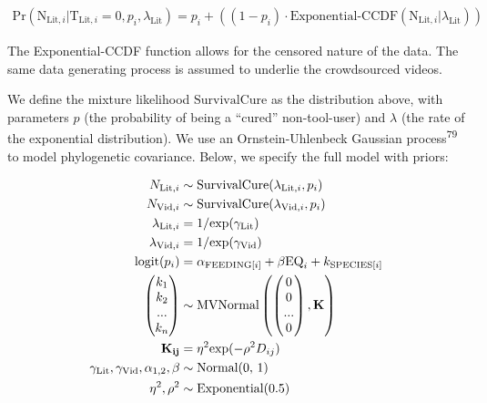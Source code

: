 \documentclass[
  man,floatsintext]{apa6}
\begin{document}
\begin{align}
\text{Pr}(\text{N}_{\text{Lit},i}|\text{T}_{\text{Lit},i} = 0,p_i,\lambda_\text{Lit}) = p_i + ((1-p_i)\cdot\text{Exponential-CCDF}(\text{N}_{\text{Lit},i}|\lambda_\text{Lit}))
\end{align}

The Exponential-CCDF function allows for the censored nature of the data. The same data generating process is assumed to underlie the crowdsourced videos.

We define the mixture likelihood \(\text{SurvivalCure}\) as the distribution above, with parameters \(p\) (the probability of being a ``cured'' non-tool-user) and \(\lambda\) (the rate of the exponential distribution). We use an Ornstein-Uhlenbeck Gaussian process\textsuperscript{79} to model phylogenetic covariance. Below, we specify the full model with priors:

\begin{align}
N_{\text{Lit},i} &\sim \text{SurvivalCure}(\lambda_{\text{Lit},i}, p_{i}) \\
N_{\text{Vid},i} &\sim \text{SurvivalCure}(\lambda_{\text{Vid},i}, p_{i}) \nonumber \\
\lambda_{\text{Lit},i} &= 1 / \text{exp}(\gamma_\text{Lit}) \nonumber \\
\lambda_{\text{Vid},i} &= 1 / \text{exp}(\gamma_\text{Vid}) \nonumber \\
\text{logit}(p_{i}) &= \alpha_{\text{FEEDING}[i]} + \beta\text{EQ}_{i} +  k_{\text{SPECIES}[i]} \nonumber \\
\begin{pmatrix}k_{1}\\k_{2}\\...\\k_{n}\\\end{pmatrix}
&\sim \text{MVNormal}
\begin{pmatrix}\begin{pmatrix}0\\0\\...\\0\\\end{pmatrix},\bf{K}\end{pmatrix} \nonumber \\
\bf{K}_{ij} &= \eta^2\text{exp}(-\rho^2D_{ij}) \nonumber \\
\gamma_\text{Lit}, \gamma_\text{Vid}, \alpha_{1,2}, \beta &\sim \text{Normal(0, 1)} \nonumber \\
\eta^2, \rho^2 &\sim \text{Exponential(0.5)} \nonumber
\end{align}
\end{document}
